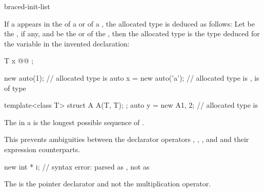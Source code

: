 \begin{bnf}
\br
    \terminal{(}  \terminal{)}\br
    braced-init-list
\end{bnf}

\pnum
If a  appears in the
 of a  or
 of a ,
the allocated type is deduced as follows:
Let
 be the , if any,
and
 be the  or  of
the , then the allocated type is the type
deduced for the variable  in the invented
declaration:
\begin{codeblock}
T x @\textrm{}@ ;
\end{codeblock}

\begin{example}
\begin{codeblock}
new auto(1);                    // allocated type is 
auto x = new auto('a');         // allocated type is ,  is of type 

template<class T> struct A { A(T, T); };
auto y = new A{1, 2};           // allocated type is 
\end{codeblock}
\end{example}

\pnum
The  in a  is the longest
possible sequence of .
\begin{note}
This prevents ambiguities between the declarator operators \tcode{\&}, \tcode{\&\&},
\tcode{*}, and \tcode{[]} and their expression counterparts.
\end{note}
\begin{example}
\begin{codeblock}
new int * i;                    // syntax error: parsed as , not as 
\end{codeblock}
The \tcode{*} is the pointer declarator and not the multiplication
operator.
\end{example}

